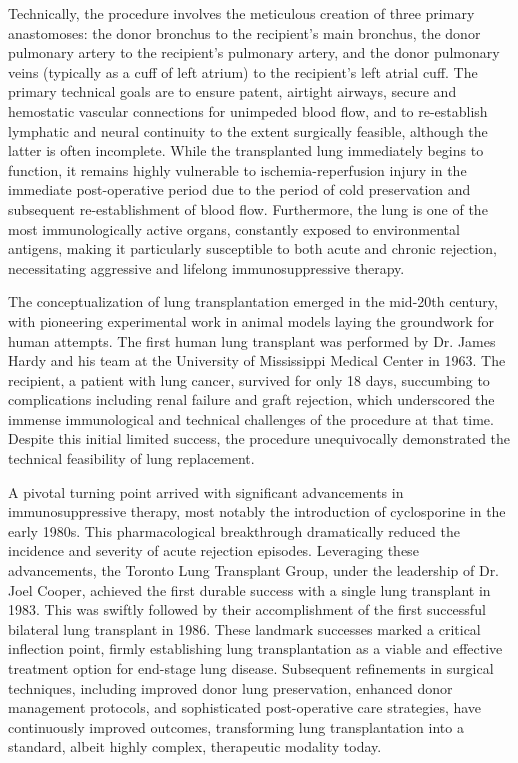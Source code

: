 Technically, the procedure involves the meticulous creation of three primary anastomoses: the donor bronchus to the recipient's main bronchus, the donor pulmonary artery to the recipient's pulmonary artery, and the donor pulmonary veins (typically as a cuff of left atrium) to the recipient's left atrial cuff. The primary technical goals are to ensure patent, airtight airways, secure and hemostatic vascular connections for unimpeded blood flow, and to re-establish lymphatic and neural continuity to the extent surgically feasible, although the latter is often incomplete. While the transplanted lung immediately begins to function, it remains highly vulnerable to ischemia-reperfusion injury in the immediate post-operative period due to the period of cold preservation and subsequent re-establishment of blood flow. Furthermore, the lung is one of the most immunologically active organs, constantly exposed to environmental antigens, making it particularly susceptible to both acute and chronic rejection, necessitating aggressive and lifelong immunosuppressive therapy.

The conceptualization of lung transplantation emerged in the mid-20th century, with pioneering experimental work in animal models laying the groundwork for human attempts. The first human lung transplant was performed by Dr. James Hardy and his team at the University of Mississippi Medical Center in 1963. The recipient, a patient with lung cancer, survived for only 18 days, succumbing to complications including renal failure and graft rejection, which underscored the immense immunological and technical challenges of the procedure at that time. Despite this initial limited success, the procedure unequivocally demonstrated the technical feasibility of lung replacement.

A pivotal turning point arrived with significant advancements in immunosuppressive therapy, most notably the introduction of cyclosporine in the early 1980s. This pharmacological breakthrough dramatically reduced the incidence and severity of acute rejection episodes. Leveraging these advancements, the Toronto Lung Transplant Group, under the leadership of Dr. Joel Cooper, achieved the first durable success with a single lung transplant in 1983. This was swiftly followed by their accomplishment of the first successful bilateral lung transplant in 1986. These landmark successes marked a critical inflection point, firmly establishing lung transplantation as a viable and effective treatment option for end-stage lung disease. Subsequent refinements in surgical techniques, including improved donor lung preservation, enhanced donor management protocols, and sophisticated post-operative care strategies, have continuously improved outcomes, transforming lung transplantation into a standard, albeit highly complex, therapeutic modality today.

